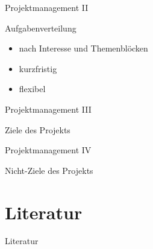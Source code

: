 \documentclass[presentation,bigger,aspectratio=169]{beamer}
\begin{document}
\begin{frame}[label={sec:orgd616fb8}]{Projektmanagement II}
\begin{block}{Aufgabenverteilung}
\begin{itemize}
\item nach Interesse und Themenblöcken
\item kurzfristig
\item flexibel
\end{itemize}
\end{block}
\end{frame}
\begin{frame}[label={sec:org0aad446}]{Projektmanagement III}
\begin{block}{Ziele des Projekts}
\end{block}
\end{frame}
\begin{frame}[label={sec:org4e9a783}]{Projektmanagement IV}
\begin{block}{Nicht-Ziele des Projekts}
\end{block}
\end{frame}
\section*{Literatur}
\label{sec:orgab9e8d1}
\begin{frame}[allowframebreaks]{Literatur}
\printbibliography[heading=none]
\end{frame}
\appendix
\end{document}
